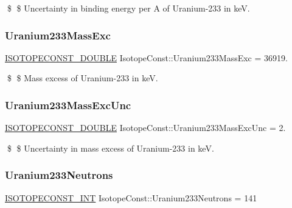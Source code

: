 \$ \$ Uncertainty in binding energy per A of Uranium-\/233 in keV. \mbox{\label{group___isotope_const-_uranium-_u233_ga7f1d5dcf40cb0d36e9740eb499ef26cc}} 
\subsubsection{\texorpdfstring{Uranium233\+Mass\+Exc}{Uranium233MassExc}}
{\footnotesize\ttfamily \mbox{\hyperlink{group___isotope_const-_macros_ga8f45a7272ce02c0b4c65c44636ed719a}{I\+S\+O\+T\+O\+P\+E\+C\+O\+N\+S\+T\+\_\+\+D\+O\+U\+B\+LE}} Isotope\+Const\+::\+Uranium233\+Mass\+Exc = 36919.}

\$ \$ Mass excess of Uranium-\/233 in keV. \mbox{\label{group___isotope_const-_uranium-_u233_gad8476dc24e87c3beeb3908caeb694e3f}} 
\subsubsection{\texorpdfstring{Uranium233\+Mass\+Exc\+Unc}{Uranium233MassExcUnc}}
{\footnotesize\ttfamily \mbox{\hyperlink{group___isotope_const-_macros_ga8f45a7272ce02c0b4c65c44636ed719a}{I\+S\+O\+T\+O\+P\+E\+C\+O\+N\+S\+T\+\_\+\+D\+O\+U\+B\+LE}} Isotope\+Const\+::\+Uranium233\+Mass\+Exc\+Unc = 2.}

\$ \$ Uncertainty in mass excess of Uranium-\/233 in keV. \mbox{\label{group___isotope_const-_uranium-_u233_ga4b67d18a7f67f5e43887ca252aaa139d}} 
\subsubsection{\texorpdfstring{Uranium233\+Neutrons}{Uranium233Neutrons}}
{\footnotesize\ttfamily \mbox{\hyperlink{group___isotope_const-_macros_ga5f18360b3e99483a35c32d789e62621c}{I\+S\+O\+T\+O\+P\+E\+C\+O\+N\+S\+T\+\_\+\+I\+NT}} Isotope\+Const\+::\+Uranium233\+Neutrons = 141}

